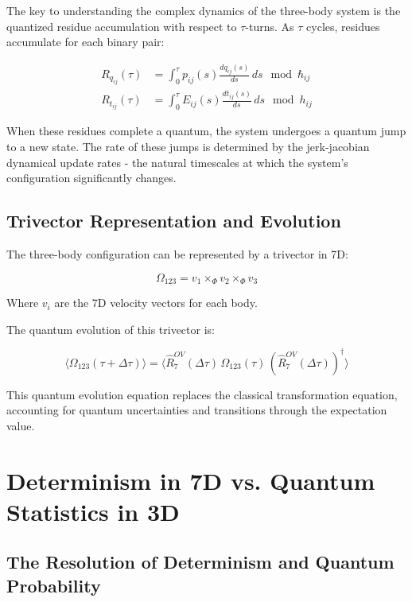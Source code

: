 \documentclass{article}
\begin{document}
The key to understanding the complex dynamics of the three-body system is the quantized residue accumulation with respect to $\tau$-turns. As $\tau$ cycles, residues accumulate for each binary pair:

\begin{align}
R_{q_{ij}}(\tau) &= \int_0^\tau p_{ij}(s) \frac{dq_{ij}(s)}{ds} \, ds \mod \hbar_{ij} \\
R_{t_{ij}}(\tau) &= \int_0^\tau E_{ij}(s) \frac{dt_{ij}(s)}{ds} \, ds \mod h_{ij}
\end{align}

When these residues complete a quantum, the system undergoes a quantum jump to a new state. The rate of these jumps is determined by the jerk-jacobian dynamical update rates - the natural timescales at which the system's configuration significantly changes.

\subsection{Trivector Representation and Evolution}

The three-body configuration can be represented by a trivector in 7D:

\begin{equation}
\Omega_{123} = v_1 \times_\Phi v_2 \times_\Phi v_3
\end{equation}

Where $v_i$ are the 7D velocity vectors for each body.

The quantum evolution of this trivector is:

\begin{equation}
\langle\Omega_{123}(\tau+\Delta\tau)\rangle = \langle\hat{R}^{OV}_7(\Delta\tau) \, \Omega_{123}(\tau) \, (\hat{R}^{OV}_7(\Delta\tau))^\dagger\rangle
\end{equation}

This quantum evolution equation replaces the classical transformation equation, accounting for quantum uncertainties and transitions through the expectation value.

\section{Determinism in 7D vs. Quantum Statistics in 3D}

\subsection{The Resolution of Determinism and Quantum Probability}
\end{document}
